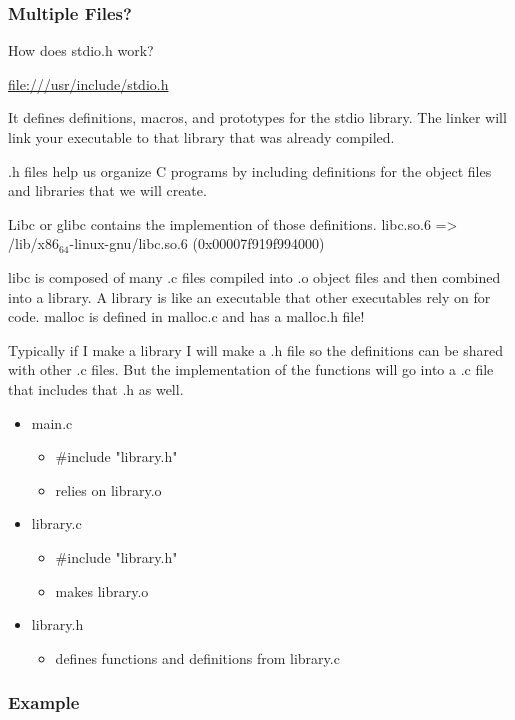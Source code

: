 \documentclass[11pt]{article}
\begin{document}
\subsubsection{Multiple Files?}
\label{sec:org67d71ae}

How does stdio.h work?

\url{file:///usr/include/stdio.h}

It defines definitions, macros, and prototypes for the stdio library.
The linker will link your executable to that library that was already
compiled.

.h files help us organize C programs by including definitions for the
object files and libraries that we will create.

Libc or glibc contains the implemention of those definitions.
libc.so.6 => /lib/x86\(_{\text{64}}\)-linux-gnu/libc.so.6 (0x00007f919f994000)

libc is composed of many .c files compiled into .o object files and
then combined into a library. A library is like an executable that
other executables rely on for code. malloc is defined in malloc.c and
has a malloc.h file!

Typically if I make a library I will make a .h file so the definitions
can be shared with other .c files. But the implementation of the functions
will go into a .c file that includes that .h as well.

\begin{itemize}
\item main.c
\begin{itemize}
\item \#include "library.h"
\item relies on library.o
\end{itemize}
\item library.c
\begin{itemize}
\item \#include "library.h"
\item makes library.o
\end{itemize}
\item library.h
\begin{itemize}
\item defines functions and definitions from library.c
\end{itemize}
\end{itemize}

\subsubsection{Example}
\label{sec:org054ba95}
\end{document}

